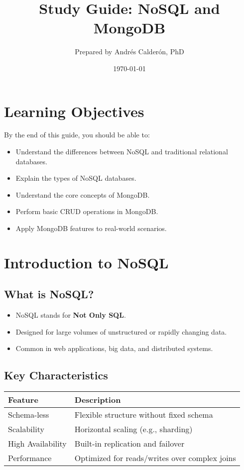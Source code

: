 \documentclass{article}
\title{\textbf{Study Guide: NoSQL and MongoDB}}
\author{Prepared by Andrés Calderón, PhD}
\date{\today}
\begin{document}
\maketitle

\section*{Learning Objectives}
By the end of this guide, you should be able to:
\begin{itemize}
    \item Understand the differences between NoSQL and traditional relational databases.
    \item Explain the types of NoSQL databases.
    \item Understand the core concepts of MongoDB.
    \item Perform basic CRUD operations in MongoDB.
    \item Apply MongoDB features to real-world scenarios.
\end{itemize}

\section{Introduction to NoSQL}

\subsection{What is NoSQL?}
\begin{itemize}
    \item NoSQL stands for \textbf{Not Only SQL}.
    \item Designed for large volumes of unstructured or rapidly changing data.
    \item Common in web applications, big data, and distributed systems.
\end{itemize}

\subsection{Key Characteristics}

\begin{center}
\begin{tabular}{@{}ll@{}}
\toprule
\textbf{Feature} & \textbf{Description} \\
\midrule
Schema-less & Flexible structure without fixed schema \\
Scalability & Horizontal scaling (e.g., sharding) \\
High Availability & Built-in replication and failover \\
Performance & Optimized for reads/writes over complex joins \\
\bottomrule
\end{tabular}
\end{center}
\end{document}
